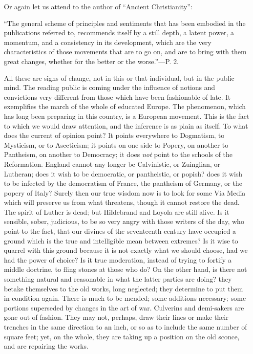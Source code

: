 Or again let us attend to the author of ``Ancient
Christianity'':

``The
general scheme of principles and sentiments that has been embodied in
the publications referred to, recommends itself by a still depth, a
latent power, a momentum, and a consistency in its development, which
are the very characteristics of those movements that are to go on, and
are to bring with them great changes, whether for the better or the
worse.''—P. 2.

All these are signs of change, not in this or
that individual, but in the public mind. The reading public is coming
under the influence of notions and convictions very different from
those which have been fashionable of late. It exemplifies the march of
the whole of educated Europe. The phenomenon, which has long been
preparing in this country, is a European movement. This is the fact to
which we would draw attention, and the inference is as plain as
itself. To what does the current of opinion point? It points
everywhere to Dogmatism, to Mysticism, or to Asceticism; it points on
one side to Popery, on another to Pantheism, on another to Democracy;
it does \emph{not} point to the schools of the Reformation. England
cannot any longer be Calvinistic, or Zuinglian, or Lutheran; does it
wish to be democratic, or pantheistic, or popish? does it wish to be
infected by the democratism of France, the pantheism of Germany, or
the popery of Italy? Surely then our true wisdom now is to look
for some Via Media which will preserve us from what threatens, though
it cannot restore the dead. The spirit of Luther is dead; but
Hildebrand and Loyola are still alive. Is it sensible, sober,
judicious, to be so very angry with those writers of the day, who
point to the fact, that our divines of the seventeenth century have
occupied a ground which is the true and intelligible mean between
extremes? Is it wise to quarrel with this ground because it is not
exactly what we should choose, had we had the power of choice? Is it
true moderation, instead of trying to fortify a middle doctrine, to
fling stones at those who do? On the other hand, is there not
something natural and reasonable in what the latter parties are doing?
they betake themselves to the old works, long neglected; they
determine to put them in condition again. There is much to be mended;
some additions necessary; some portions superseded by changes in the
art of war. Culverins and demi-sakers are gone out of fashion. They
may not, perhaps, draw their lines or make their trenches in the same
direction to an inch, or so as to include the same number of square
feet; yet, on the whole, they are taking up a position on the old
sconce, and are repairing the works.


